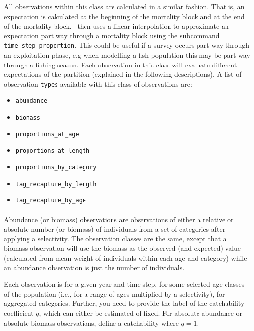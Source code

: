 \subsubsection{}

All observations within this class are calculated in a similar fashion. That is, an expectation is calculated at the beginning of the mortality block and at the end of the mortality block. \CNAME\ then uses a linear interpolation to approximate an expectation part way through a mortality block using the subcommand \texttt{time\_step\_proportion}. This could be useful if a survey occurs part-way through an exploitation phase, e.g when modelling a fish population this may be part-way through a fishing season. Each observation in this class will evaluate different expectations of the partition (explained in the following descriptions). A list of observation \texttt{types} available with this class of observations are:
\begin{itemize}
	\item \texttt{abundance}
	\item \texttt{biomass}
	\item \texttt{proportions\_at\_age}
	\item \texttt{proportions\_at\_length}	
	\item \texttt{proportions\_by\_category}	
	\item \texttt{tag\_recapture\_by\_length}		
	\item \texttt{tag\_recapture\_by\_age}														
\end{itemize}

\paragraph*{}
Abundance (or biomass) observations are observations of either a relative or absolute number (or biomass) of individuals from a set of categories after applying a selectivity. The observation classes are the same, except that a biomass observation will use the biomass as the observed (and expected) value (calculated from mean weight of individuals within each age and category) while an abundance observation is just the number of individuals. 

Each observation is for a given year and time-step, for some selected age classes of the population (i.e., for a range of ages multiplied by a selectivity), for aggregated categories. Further, you need to provide the label of the catchability coefficient $q$, which can either be estimated of fixed. For absolute abundance or absolute biomass observations, define a catchability where $q=1$.

